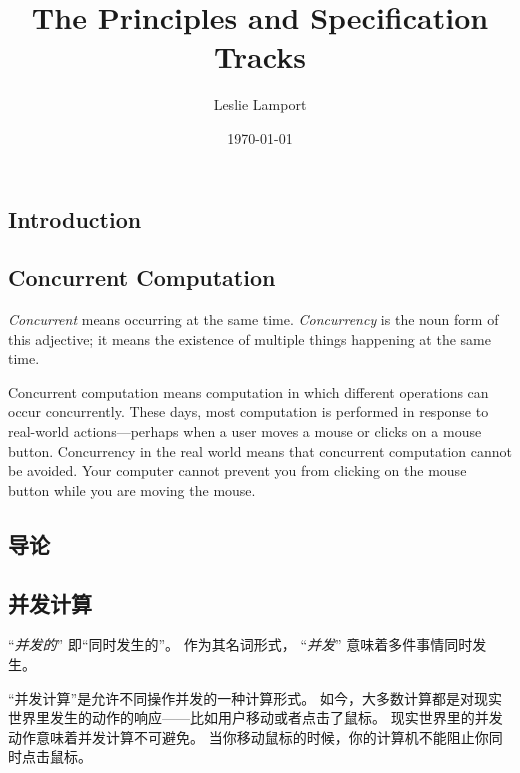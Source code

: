 \documentclass[fleqn,leqno]{article}
\title{\bf The Principles and Specification Tracks}
\author{Leslie Lamport}
\date{\today}
\begin{document}
{}
\showversions
\tableofcontents
\hideversions
\vfill
\newpage
\vspace*{-\baselineskip}

\begin{en}
\section{Introduction}

\subsection{Concurrent Computation}

\emph{Concurrent} 
means occurring at the same time.
\emph{Concurrency} 
is the noun form of this adjective; it means the
existence of multiple things happening at the same time.

Concurrent computation means computation in which different operations
can occur concurrently.  These days, most computation is performed in
response to real-world actions---perhaps when a user moves a mouse or
clicks on a mouse button.  Concurrency in the real world means that
concurrent computation cannot be avoided.  Your computer cannot
prevent you from clicking on the mouse button while you are moving the
mouse.
\end{en}

\begin{ch}
\section{导论}

\subsection{并发计算}

 ``\emph{并发的}'' 即``同时发生的''。
作为其名词形式，
 ``\emph{并发}'' 意味着多件事情同时发生。

``并发计算''是允许不同操作并发的一种计算形式。
如今，大多数计算都是对现实世界里发生的动作的响应——比如用户移动或者点击了鼠标。
现实世界里的并发动作意味着并发计算不可避免。
当你移动鼠标的时候，你的计算机不能阻止你同时点击鼠标。
\end{ch}
\end{document}
